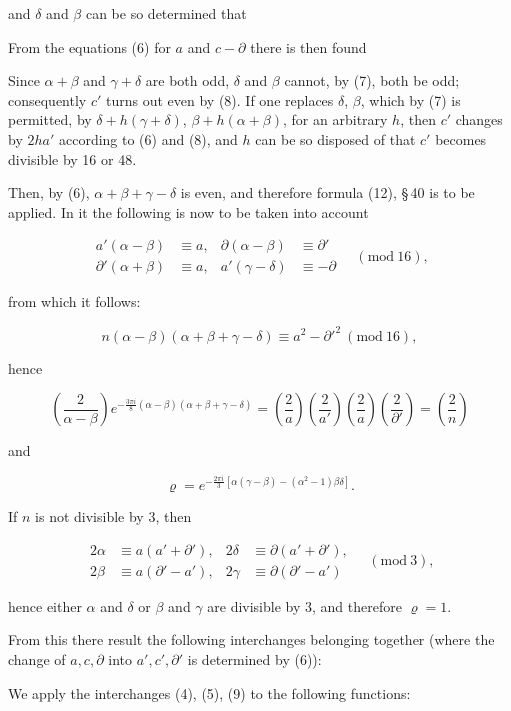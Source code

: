 and $\delta$ and $\beta$ can be so determined that


From the equations (6) for $a$ and $c-\partial$ there is then found


Since $\alpha+\beta$ and $\gamma+\delta$ are both odd, $\delta$ and $\beta$
cannot, by (7), both be odd; consequently $c'$ turns out even by (8).
If one replaces $\delta$, $\beta$, which by (7) is permitted, by
$\delta+h(\gamma+\delta)$, $\beta+h(\alpha+\beta)$, for an arbitrary $h$, then
$c'$ changes by $2ha'$ according to (6) and (8), and $h$ can be so disposed
of that $c'$ becomes divisible by 16 or 48.

Then, by (6), $\alpha+\beta+\gamma-\delta$ is even, and therefore
formula (12), \S\,40 is to be applied. In it the following is now to be taken into account


\[
\begin{aligned}
a'(\alpha-\beta) &\equiv a, & \partial(\alpha-\beta) &\equiv \partial' \\
\partial'(\alpha+\beta) &\equiv a, & a'(\gamma-\delta) &\equiv -\partial
\end{aligned} \quad (\mathrm{mod}\ 16),
\]

from which it follows:

\[
n(\alpha-\beta)(\alpha+\beta+\gamma-\delta) \equiv a^2 - \partial'^2 \ (\mathrm{mod}\ 16),
\]

hence

\[
\left(\frac{2}{\alpha-\beta}\right) e^{-\frac{3\pi i}{8}(\alpha-\beta)(\alpha+\beta+\gamma-\delta)} = \left(\frac{2}{a}\right)\left(\frac{2}{a'}\right)\left(\frac{2}{a}\right)\left(\frac{2}{\partial'}\right) = \left(\frac{2}{n}\right)
\]

and

\[
\varrho = e^{-\frac{2\pi i}{3}\left[\alpha(\gamma-\beta)-(\alpha^2-1)\beta\delta\right]}.
\]

If $n$ is not divisible by 3, then

\[
\begin{aligned}
2\alpha &\equiv a(a'+\partial'), & 2\delta &\equiv \partial(a'+\partial'), \\
2\beta &\equiv a(\partial'-a'), & 2\gamma &\equiv \partial(\partial'-a')
\end{aligned} \quad (\mathrm{mod}\ 3),
\]

hence either $\alpha$ and $\delta$ or $\beta$ and $\gamma$ are divisible by 3, and therefore
$\varrho = 1$.

From this there result the following interchanges belonging together
 (where the change of $a, c, \partial$ into $a', c', \partial'$ is determined by (6)):


We apply the interchanges (4), (5), (9) to the following
functions:
